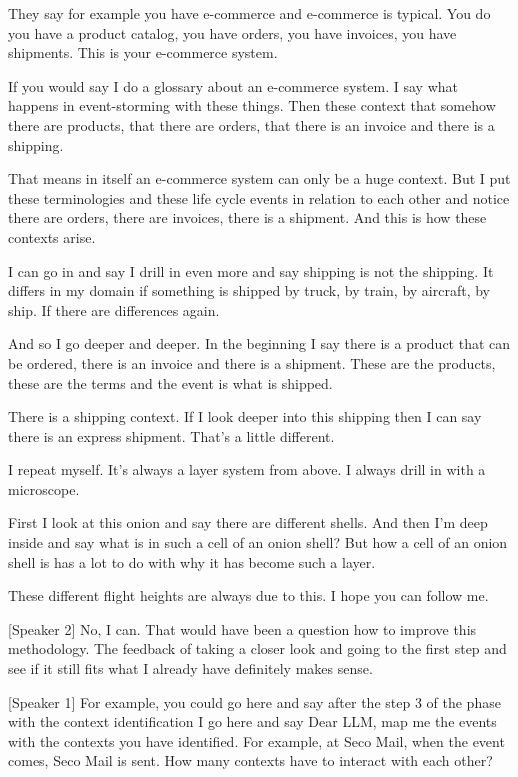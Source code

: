 They say for example you have e-commerce and e-commerce is typical. You do you have a product catalog, you have orders, you have invoices, you have shipments. This is your e-commerce system.

If you would say I do a glossary about an e-commerce system. I say what happens in event-storming with these things. Then these context that somehow there are products, that there are orders, that there is an invoice and there is a shipping.

That means in itself an e-commerce system can only be a huge context. But I put these terminologies and these life cycle events in relation to each other and notice there are orders, there are invoices, there is a shipment. And this is how these contexts arise.

I can go in and say I drill in even more and say shipping is not the shipping. It differs in my domain if something is shipped by truck, by train, by aircraft, by ship. If there are differences again.

And so I go deeper and deeper. In the beginning I say there is a product that can be ordered, there is an invoice and there is a shipment. These are the products, these are the terms and the event is what is shipped.

There is a shipping context. If I look deeper into this shipping then I can say there is an express shipment. That's a little different.

I repeat myself. It's always a layer system from above. I always drill in with a microscope.

First I look at this onion and say there are different shells. And then I'm deep inside and say what is in such a cell of an onion shell? But how a cell of an onion shell is has a lot to do with why it has become such a layer.

These different flight heights are always due to this. I hope you can follow me.

[Speaker 2]
No, I can. That would have been a question how to improve this methodology. The feedback of taking a closer look and going to the first step and see if it still fits what I already have definitely makes sense.

[Speaker 1]
For example, you could go here and say after the step 3 of the phase with the context identification I go here and say Dear LLM, map me the events with the contexts you have identified. For example, at Seco Mail, when the event comes, Seco Mail is sent. How many contexts have to interact with each other?

